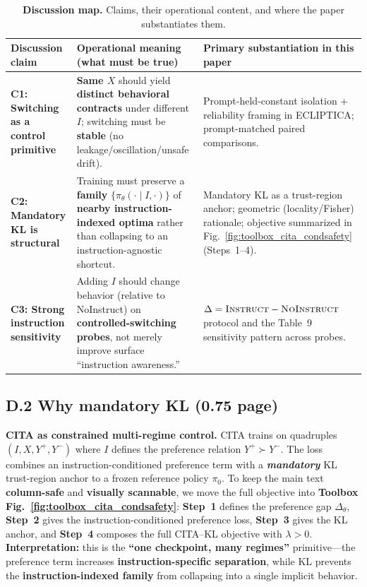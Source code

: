 \vspace{-0.4em}
\begin{table}[t]
\centering
\small
\setlength{\tabcolsep}{6pt}
\begin{tabular}{p{3.2cm}p{6.9cm}p{5.9cm}}
\toprule
\textbf{Discussion claim} & \textbf{Operational meaning (what must be true)} & \textbf{Primary substantiation in this paper} \\
\midrule
\textbf{C1: Switching as a control primitive} &
\textbf{Same $X$} should yield \textbf{distinct behavioral contracts} under different $I$; switching must be \textbf{stable} (no leakage/oscillation/unsafe drift). &
Prompt-held-constant isolation + reliability framing in ECLIPTICA; prompt-matched paired comparisons. \\
\textbf{C2: Mandatory KL is structural} &
Training must preserve a \textbf{family} $\{\pi_\theta(\cdot\mid I,\cdot)\}$ of \textbf{nearby instruction-indexed optima} rather than collapsing to an instruction-agnostic shortcut. &
Mandatory KL as a trust-region anchor; geometric (locality/Fisher) rationale; objective summarized in Fig.~\ref{fig:toolbox_cita_condsafety} (Steps~1--4). \\
\textbf{C3: Strong instruction sensitivity} &
Adding $I$ should change behavior (relative to NoInstruct) on \textbf{controlled-switching probes}, not merely improve surface ``instruction awareness.'' &
$\Delta=\textsc{Instruct}-\textsc{NoInstruct}$ protocol and the Table~9 sensitivity pattern across probes. \\
\bottomrule
\end{tabular}
\vspace{-0.3em}
\caption{\textbf{Discussion map.} Claims, their operational content, and where the paper substantiates them.}
\label{tab:discussion_claims}
\vspace{-0.9em}
\end{table}

\vspace{-0.35em}
\subsection{D.2 Why mandatory KL (0.75 page)}
\vspace{-0.2em}

\noindent\textbf{CITA as constrained multi-regime control.}
CITA trains on quadruples $(I,X,Y^+,Y^-)$ where $I$ defines the preference relation $Y^+\succ Y^-$. The loss combines an instruction-conditioned preference term with a \textbf{\emph{mandatory}} KL trust-region anchor to a frozen reference policy $\pi_0$. To keep the main text \textbf{column-safe} and \textbf{visually scannable}, we move the full objective into \textbf{Toolbox Fig.~\ref{fig:toolbox_cita_condsafety}}: \textbf{Step~1} defines the preference gap $\Delta_\theta$, \textbf{Step~2} gives the instruction-conditioned preference loss, \textbf{Step~3} gives the KL anchor, and \textbf{Step~4} composes the full CITA--KL objective with $\lambda>0$. \textbf{Interpretation:} this is the \textbf{``one checkpoint, many regimes''} primitive---the preference term increases \textbf{instruction-specific separation}, while KL prevents the \textbf{instruction-indexed family} from collapsing into a single implicit behavior.

